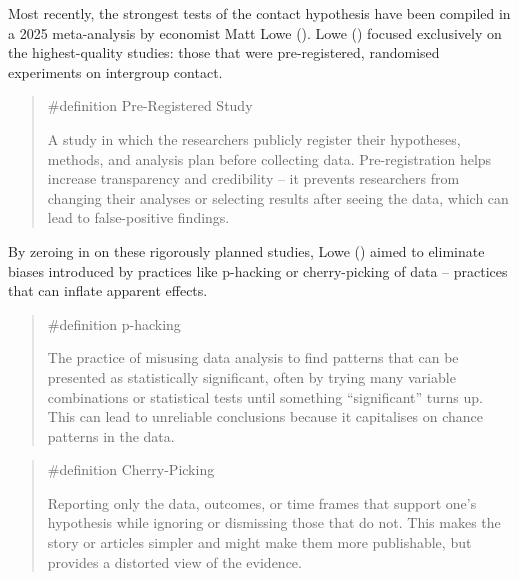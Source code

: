 \documentclass[
  letterpaper,
]{book}
\begin{document}
Most recently, the strongest tests of the contact hypothesis have been
compiled in a 2025 meta-analysis by economist Matt Lowe
(). Lowe
() focused exclusively on the
highest-quality studies: those that were pre-registered, randomised
experiments on intergroup contact.

\begin{quote}
\label{def-pre_registered_study}{\#definition}
Pre-Registered Study

A study in which the researchers publicly register their hypotheses,
methods, and analysis plan before collecting data. Pre-registration
helps increase transparency and credibility -- it prevents researchers
from changing their analyses or selecting results after seeing the data,
which can lead to false-positive findings.
\end{quote}

By zeroing in on these rigorously planned studies, Lowe
() aimed to eliminate biases
introduced by practices like p-hacking or cherry-picking of data --
practices that can inflate apparent effects.

\begin{quote}
\label{def-p_hacking}{\#definition} p-hacking

The practice of misusing data analysis to find patterns that can be
presented as statistically significant, often by trying many variable
combinations or statistical tests until something ``significant'' turns
up. This can lead to unreliable conclusions because it capitalises on
chance patterns in the data.
\end{quote}

\begin{quote}
\label{def-cherry_picking}{\#definition} Cherry-Picking

Reporting only the data, outcomes, or time frames that support one's
hypothesis while ignoring or dismissing those that do not. This makes
the story or articles simpler and might make them more publishable, but
provides a distorted view of the evidence.
\end{quote}
\end{document}
